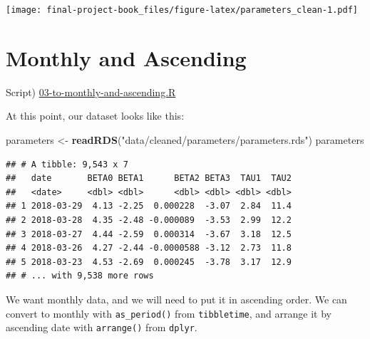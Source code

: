 \documentclass[]{book}
\newenvironment{Shaded}{\begin{snugshade}}{\end{snugshade}}
\newcommand{\DataTypeTok}[1]{\textcolor[rgb]{0.13,0.29,0.53}{#1}}
\newcommand{\KeywordTok}[1]{\textcolor[rgb]{0.13,0.29,0.53}{\textbf{#1}}}
\newcommand{\NormalTok}[1]{#1}
\newcommand{\OperatorTok}[1]{\textcolor[rgb]{0.81,0.36,0.00}{\textbf{#1}}}
\newcommand{\StringTok}[1]{\textcolor[rgb]{0.31,0.60,0.02}{#1}}
\theoremstyle{definition}
\theoremstyle{definition}
\theoremstyle{definition}
\theoremstyle{remark}
\begin{document}
\texttt{[image: final-project-book\_files/figure-latex/parameters\_clean-1.pdf]}

\hypertarget{monthly}{%
\section{Monthly and Ascending}\label{monthly}}

Script)
\href{./R/03-to-monthly-and-ascending.R}{03-to-monthly-and-ascending.R}

At this point, our dataset looks like this:

\begin{Shaded}
\begin{Highlighting}[]
\NormalTok{parameters <-}\StringTok{ }\KeywordTok{readRDS}\NormalTok{(}\StringTok{"data/cleaned/parameters/parameters.rds"}\NormalTok{)}
\NormalTok{parameters}
\end{Highlighting}
\end{Shaded}

\begin{verbatim}
## # A tibble: 9,543 x 7
##   date       BETA0 BETA1      BETA2 BETA3  TAU1  TAU2
##   <date>     <dbl> <dbl>      <dbl> <dbl> <dbl> <dbl>
## 1 2018-03-29  4.13 -2.25  0.000228  -3.07  2.84  11.4
## 2 2018-03-28  4.35 -2.48 -0.000089  -3.53  2.99  12.2
## 3 2018-03-27  4.44 -2.59  0.000314  -3.67  3.18  12.5
## 4 2018-03-26  4.27 -2.44 -0.0000588 -3.12  2.73  11.8
## 5 2018-03-23  4.53 -2.69  0.000245  -3.78  3.17  12.9
## # ... with 9,538 more rows
\end{verbatim}

We want monthly data, and we will need to put it in ascending order. We
can convert to monthly with \texttt{as\_period()} from
\texttt{tibbletime}, and arrange it by ascending date with
\texttt{arrange()} from \texttt{dplyr}.

\begin{Shaded}
\end{Shaded}
\end{document}
